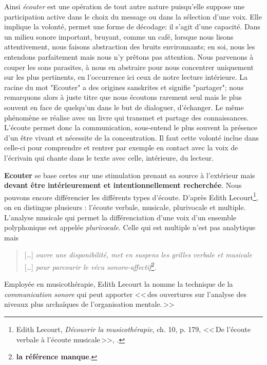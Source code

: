 Ainsi \emph{écouter} est une opération de tout autre nature
puisqu'elle suppose une participation active dans le choix du message
ou dans la sélection d'une voix. Elle  implique la volonté,
permet une forme de décodage: il s'agit d'une capacité. Dans un milieu sonore important, bruyant, comme un café, lorsque nous lisons attentivement, nous faisons abstraction
des bruits environnants; en soi, nous les entendons parfaitement mais nous n'y
prêtons pas attention. Nous parvenons à couper les sons parasites, à nous en abstraire pour
nous concentrer uniquement sur les plus  pertinents, en l'occurrence ici ceux de notre lecture intérieure.
 La racine du mot "Ecouter" a des origines sanskrites et signifie "partager"; nous remarquons alors à juste titre que nous écoutons rarement seul mais  le plus souvent en face de quelqu'un dans le but de dialoguer, d'échanger. Le même phénomène se réalise avec un livre qui transmet et partage des connaissances. L'écoute permet donc la communication, sous-entend le plus souvent la présence d'un être vivant et nécessite de la  concentration. Il faut cette volonté inclue dans celle-ci  pour comprendre et rentrer par exemple en contact avec la voix de  l'écrivain qui chante dans le texte avec celle, intérieure,  du lecteur.

 





\textbf{Ecouter} se base certes sur une stimulation prenant sa source à
l'extérieur mais \textbf{devant être intérieurement et  intentionnellement
	recherchée}.
Nous pouvons encore différencier les différents types d'écoute. D'après Edith Lecourt\footnote{Edith Lecourt, \textsl{Découvrir la musicothérapie}, ch. 10, p. 179, <<\,De l'écoute verbale à l'écoute musicale\,>>, \cite{lecourt:decouvrir}.}, on en distingue plusieurs : l'écoute verbale, musicale, plurivocale et multiple.
 L'analyse musicale qui permet la différenciation d'une voix d'un ensemble polyphonique est appelée \emph{plurivocale}. Celle qui est multiple n'est pas analytique  mais 
 \begin{quote}
 	 [\ldots] \textit{ouvre une disponibilité, met en suspens les grilles verbale et musicale} [\ldots] \emph{pour parcourir le vécu sonoro-affectif}\footnote{\textbf{la référence manque}.}.
 \end{quote}
 Employée en musicothérapie, Edith Lecourt la nomme  la technique de la  \emph{communication sonore} qui peut apporter 
 <<\,des ouvertures sur l'analyse des niveaux plus archaïques de l'organisation mentale.\,>>	

